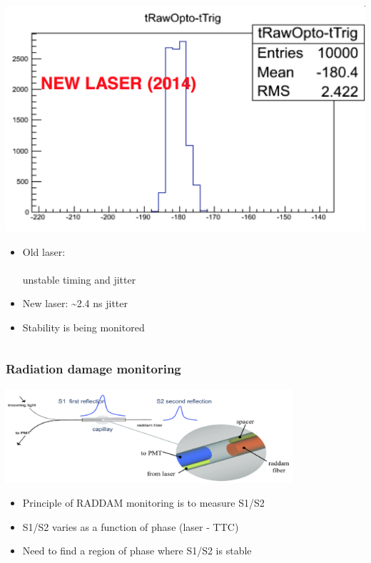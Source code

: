 \documentclass[bigger]{beamer}
\begin{document}
\begin{frame}
\begin{columns}
\begin{column}{0.55\textwidth}
\centering
\includegraphics[width=\textwidth]{fig/laser/laser_new.png}
\begin{itemize}

\item Old laser:\\\\
\label{sec-4-2-1-1-2-2}%
unstable timing and jitter

\item New laser: \~{}2.4 ns jitter
\label{sec-4-2-1-1-2-3}%

\item Stability is being monitored
\label{sec-4-2-1-1-2-4}%
\end{itemize} %
\end{column}
\end{columns}
\end{frame}
\begin{frame}
\frametitle{Radiation damage monitoring}
\label{sec-4-2-2}
\label{sec-4-2-2-1}

\centering
\includegraphics[width=0.8\textwidth]{fig/laser/hf_raddam_explanation.png}
\begin{itemize}

\item Principle of RADDAM monitoring is to measure S1/S2
\label{sec-4-2-2-2}%

\item S1/S2 varies as a function of phase (laser - TTC)
\label{sec-4-2-2-3}%

\item Need to find a region of phase where S1/S2 is stable
\label{sec-4-2-2-4}%
\end{itemize} %
\end{frame}
\end{document}
